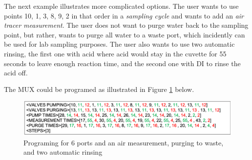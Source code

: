 \documentclass[]{book}
\begin{document}
The next example illustrates more complicated options. The user wants to use points 10, 1, 3, 8, 9, 2 in that order in a \emph{sampling cycle} and wants to add an \emph{air tracer measurement}. The user does not want to purge water back to the sampling point, but rather, wants to purge all water to a waste port, which incidently can be used for lab sampling purposes. The user also wants to use two automatic rinsing, the first one with acid where acid would stay in the cuvette for 55 seconds to leave enough reaction time, and the second one with DI to rinse the acid off.

The MUX could be programed as illustrated in Figure \ref{fig:Config2rinsesMUXPart} below.

\begin{figure}

\includegraphics[width=0.8\linewidth]{pictures/Config2rinsesMUXPart} \hfill{}

\caption{Programing for 6 ports and an air measurement, purging to waste, and two automatic rinsing}\label{fig:Config2rinsesMUXPart}
\end{figure}
\end{document}

